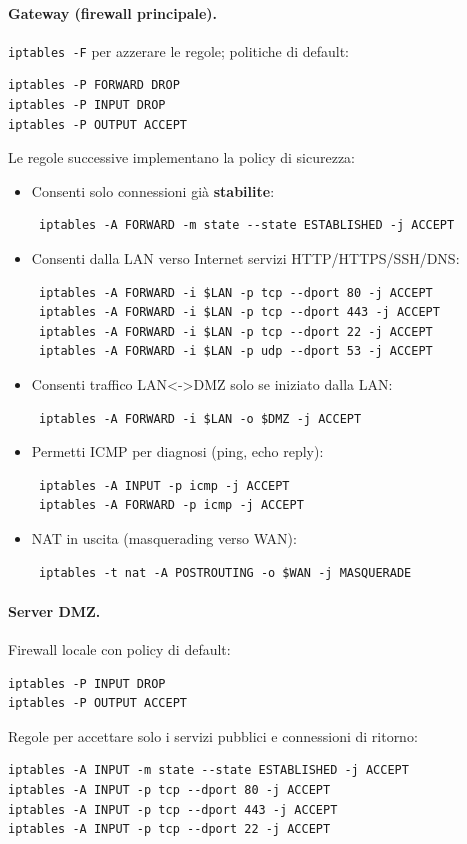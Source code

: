 \paragraph{Gateway (firewall principale).}
\texttt{iptables -F} per azzerare le regole; politiche di default:
\begin{verbatim}
iptables -P FORWARD DROP
iptables -P INPUT DROP
iptables -P OUTPUT ACCEPT
\end{verbatim}
Le regole successive implementano la policy di sicurezza:

\begin{itemize}
 \item Consenti solo connessioni già \textbf{stabilite}:
 \begin{verbatim}
 iptables -A FORWARD -m state --state ESTABLISHED -j ACCEPT
 \end{verbatim}
 \item Consenti dalla LAN verso Internet servizi HTTP/HTTPS/SSH/DNS:
 \begin{verbatim}
 iptables -A FORWARD -i $LAN -p tcp --dport 80 -j ACCEPT
 iptables -A FORWARD -i $LAN -p tcp --dport 443 -j ACCEPT
 iptables -A FORWARD -i $LAN -p tcp --dport 22 -j ACCEPT
 iptables -A FORWARD -i $LAN -p udp --dport 53 -j ACCEPT
 \end{verbatim}
 \item Consenti traffico LAN<->DMZ solo se iniziato dalla LAN:
 \begin{verbatim}
 iptables -A FORWARD -i $LAN -o $DMZ -j ACCEPT
 \end{verbatim}
 \item Permetti ICMP per diagnosi (ping, echo reply):
 \begin{verbatim}
 iptables -A INPUT -p icmp -j ACCEPT
 iptables -A FORWARD -p icmp -j ACCEPT
 \end{verbatim}
 \item NAT in uscita (masquerading verso WAN):
 \begin{verbatim}
 iptables -t nat -A POSTROUTING -o $WAN -j MASQUERADE
 \end{verbatim}
\end{itemize}

\paragraph{Server DMZ.}
Firewall locale con policy di default:
\begin{verbatim}
iptables -P INPUT DROP
iptables -P OUTPUT ACCEPT
\end{verbatim}
Regole per accettare solo i servizi pubblici e connessioni di ritorno:
\begin{verbatim}
iptables -A INPUT -m state --state ESTABLISHED -j ACCEPT
iptables -A INPUT -p tcp --dport 80 -j ACCEPT
iptables -A INPUT -p tcp --dport 443 -j ACCEPT
iptables -A INPUT -p tcp --dport 22 -j ACCEPT
\end{verbatim}

